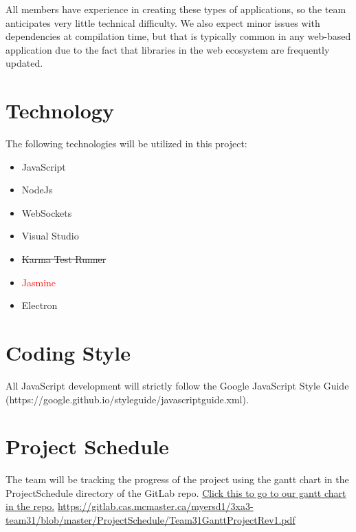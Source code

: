 \documentclass{article}
\begin{document}
All members have experience in creating these types of applications, so the team anticipates very little technical difficulty. We also expect minor issues with dependencies at compilation time, but that is typically common in any web-based application due to the fact that libraries in the web ecosystem are frequently updated. 


\section{Technology}
The following technologies will be utilized in this project: 
\begin{itemize}
    \item JavaScript
    \item NodeJs
    \item WebSockets
    \item Visual Studio
    \item \sout{Karma Test Runner}
    \item \textcolor{red}{Jasmine}
    \item Electron
\end{itemize}

\section{Coding Style}
All JavaScript development will strictly follow the Google JavaScript Style Guide (https://google.github.io/styleguide/javascriptguide.xml).

\section{Project Schedule}
The team will be tracking the progress of the project using the gantt chart in the ProjectSchedule directory of the GitLab repo.
\newline
\href{https://gitlab.cas.mcmaster.ca/myersd1/3xa3-team31/blob/master/ProjectSchedule/Team31GanttProjectRev1.pdf}{Click this to go to our gantt chart in the repo.}
\newline
\url{https://gitlab.cas.mcmaster.ca/myersd1/3xa3-team31/blob/master/ProjectSchedule/Team31GanttProjectRev1.pdf}

\end{document}

